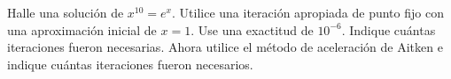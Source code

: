 \begin{statement}{2}
  Halle una soluci\'on de $x^{10} = e^x$. Utilice una iteraci\'on
  apropiada de punto fijo con una aproximaci\'on inicial de $x = 1$.
  Use una exactitud de $10^{-6}$.
  Indique cu\'antas iteraciones fueron necesarias.
  Ahora utilice el m\'etodo de aceleraci\'on de Aitken e
  indique cu\'antas iteraciones fueron necesarios.
\end{statement}